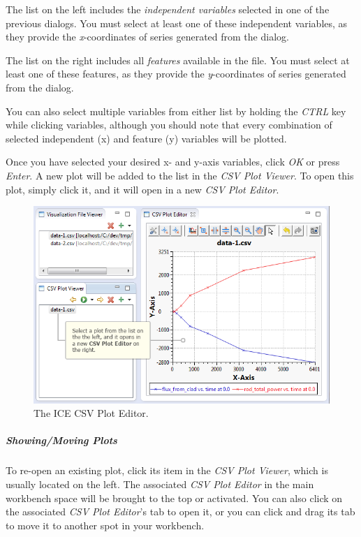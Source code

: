 The list on the left includes the \emph{independent variables} selected
in one of the previous dialogs. You must select at least one of these
independent variables, as they provide the \emph{x}-coordinates of
series generated from the dialog.

The list on the right includes all \emph{features} available in the
file. You must select at least one of these features, as they provide
the \emph{y}-coordinates of series generated from the dialog.

You can also select multiple variables from either list by holding the
\emph{CTRL} key while clicking variables, although you should note that
every combination of selected independent (x) and feature (y) variables
will be plotted.

Once you have selected your desired x- and y-axis variables, click
\emph{OK} or press \emph{Enter}. A new plot will be added to the list in
the \emph{CSV Plot Viewer}. To open this plot, simply click it, and it
will open in a new \emph{CSV Plot Editor}.

\begin{figure}[htbp]
\centering
\includegraphics[width=\textwidth]{figures/ICE_CSVPlotEditor.png}
\caption{The ICE CSV Plot Editor. }
\end{figure}

\subparagraph{Showing/Moving Plots}\label{showingmoving-plots}

To re-open an existing plot, click its item in the \emph{CSV Plot
Viewer}, which is usually located on the left. The associated \emph{CSV
Plot Editor} in the main workbench space will be brought to the top or
activated. You can also click on the associated \emph{CSV Plot Editor}'s
tab to open it, or you can click and drag its tab to move it to another
spot in your workbench.


